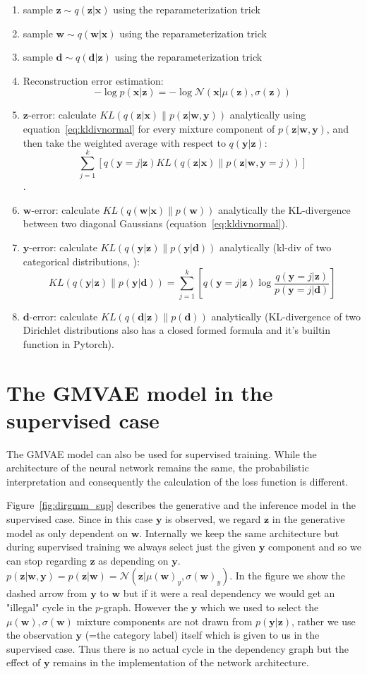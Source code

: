\documentclass[11pt, a4paper]{report}
\theoremstyle{plain}
\theoremstyle{definition}
\theoremstyle{remark}
\newcommand{\x}{\mathbf{x}}
\newcommand{\z}{\mathbf{z}}
\newcommand{\y}{\mathbf{y}}
\newcommand{\w}{\mathbf{w}}
\newcommand{\dd}{\mathbf{d}}
\newcommand{\NN}{\mathcal{N}}
\begin{document}
\begin{enumerate}
\item{sample} $\z \sim q(\z | \x)$ using the reparameterization trick
\item{sample} $\w \sim q(\w | \x)$ using the reparameterization trick
\item{sample} $\dd \sim q(\dd | \z)$ using the reparameterization trick
\item{Reconstruction error estimation}:
$$-\log p(\x | \z) = -\log \NN(\x | \mu(\z), \sigma(\z))$$
\item{$\z$-error}: calculate $KL(q(\z | \x) \| p(\z | \w, \y))$ analytically
using equation~\ref{eq:kldivnormal}
for every mixture component of $p(\z | \w, \y)$,
and then take the weighted average with respect
to $q(\y | \z)$:
$$\sum_{j=1}^k [ q(\y=j | \z) KL(q(\z | \x) \| p(\z | \w, \y=j))]$$.
\item{$\w$-error}: calculate $KL(q(\w | \x) \| p(\w))$ analytically 
the KL-divergence between two diagonal Gaussians (equation~\ref{eq:kldivnormal}).
\item{$\y$-error}:
calculate $KL(q(\y | \z) \| p(\y | \dd))$ analytically (kl-div of
two categorical distributions, ):
$$KL(q(\y | \z) \| p(\y | \dd)) = 
\sum_{j=1}^k [ q(\y=j | \z) \log \frac{q(\y=j | \z)}{p(\y = j | \dd)}]$$
\item{$\dd$-error}:
calculate $KL(q(\dd | \z) \| p(\dd))$ analytically
(KL-divergence of two Dirichlet distributions also has a closed formed
formula and it's builtin function in Pytorch).
\end{enumerate}

\section{The GMVAE model in the supervised case}

The GMVAE model can also be used for supervised training. While the
architecture of the neural network remains the same, the probabilistic
interpretation and consequently the calculation of the loss function is
different.

Figure~\ref{fig:dirgmm_sup} describes the generative and the inference model in
the supervised case.
Since in this case $\y$ is observed, we regard $\z$ in the generative model
as only dependent on $\w$. Internally we keep the same architecture but during
supervised training we always select just the given $\y$ component and so we
can stop regarding $\z$ as depending on $\y$.
$p(\z | \w, \y) = p(\z | \w) = \NN(\z | \mu(\w)_y, \sigma(\w)_y)$.
In the figure we show the dashed arrow from $\y$ to $\w$ but if it were a real
dependency we would get an "illegal" cycle in the $p$-graph. However the $\y$
which we used to select the $\mu(\w), \sigma(\w)$ mixture components are not
drawn from $p(\y | \z)$, rather we use the observation $\y$ (=the category
label) itself which is
given to us in the supervised case. Thus there is no actual cycle in the
dependency graph but the effect of $\y$ remains in the implementation of the
network architecture. 
\end{document}
